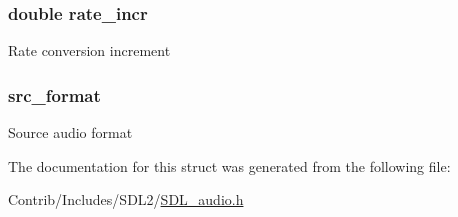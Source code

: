 \subsubsection[{\texorpdfstring{rate\+\_\+incr}{rate_incr}}]{\setlength{\rightskip}{0pt plus 5cm}double rate\+\_\+incr}\hypertarget{struct_s_d_l___audio_c_v_t_aa84e79f31da7eaa8715492a7655fc12e}{}\label{struct_s_d_l___audio_c_v_t_aa84e79f31da7eaa8715492a7655fc12e}
Rate conversion increment 
\subsubsection[{\texorpdfstring{src\+\_\+format}{src_format}}]{ src\+\_\+format}\hypertarget{struct_s_d_l___audio_c_v_t_a7ba62bb8fb82944259397ba96b6ce3ec}{}\label{struct_s_d_l___audio_c_v_t_a7ba62bb8fb82944259397ba96b6ce3ec}
Source audio format 

The documentation for this struct was generated from the following file\+:\begin{DoxyCompactItemize}
\item 
Contrib/\+Includes/\+S\+D\+L2/\hyperlink{_s_d_l__audio_8h}{S\+D\+L\+\_\+audio.\+h}\end{DoxyCompactItemize}

